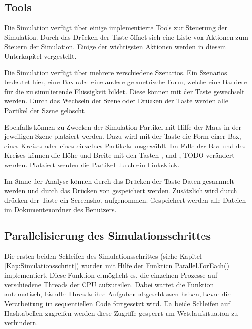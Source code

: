 \documentclass[a4paper, 12pt]{article}
\begin{document}
\subsection{Tools}
Die Simulation verfügt über einige implementierte Tools zur Steuerung der Simulation. Durch das Drücken der Taste  öffnet sich eine Liste von Aktionen zum Steuern der Simulation. Einige der wichtigsten Aktionen werden in diesem Unterkapitel vorgestellt. 

Die Simulation verfügt über mehrere verschiedene \glqq Szenarios\grqq{}. Ein \glqq Szenarios\grqq{} bedeutet hier, eine Box oder eine andere geometrische Form, welche eine Barriere für die zu simulierende Flüssigkeit bildet. Diese können mit der Taste  gewechselt werden. Durch das Wechseln der Szene oder Drücken der Taste  werden alle Partikel der Szene gelöscht. 

Ebenfalls können zu Zwecken der Simulation Partikel mit Hilfe der Maus in der jeweiligen Szene platziert werden. Dazu wird mit der Taste  die Form einer Box, eines Kreises oder eines einzelnes Partikels
ausgewählt. Im Falle der Box und des Kreises können die Höhe und Breite mit den Tasten ,  und ,  TODO verändert werden. Platziert werden die Partikel durch ein Linksklick.

Im Sinne der Analyse können durch das Drücken der Taste  Daten gesammelt werden und durch das Drücken von  gespeichert werden. Zusätzlich wird durch drücken der Taste  ein Screenshot aufgenommen. Gespeichert werden alle Dateien im Dokumentenordner des Benutzers.

\subsection{Parallelisierung des Simulationsschrittes}
Die ersten beiden Schleifen des Simulationsschrittes (siehe Kapitel \ref{Kap:Simulationsschritt}) wurden mit Hilfe der Funktion Parallel.ForEach() implementiert. Diese Funktion ermöglicht es, die einzelnen Prozesse auf verschiedene Threads der CPU aufzuteilen. Dabei wartet die Funktion automatisch, bis alle Threads ihre Aufgaben abgeschlossen haben, bevor die Verarbeitung im sequentiellen Code fortgesetzt wird. Da beide Schleifen auf Hashtabellen zugreifen werden diese Zugriffe gesperrt um Wettlaufsituation zu verhindern.  
\end{document}
